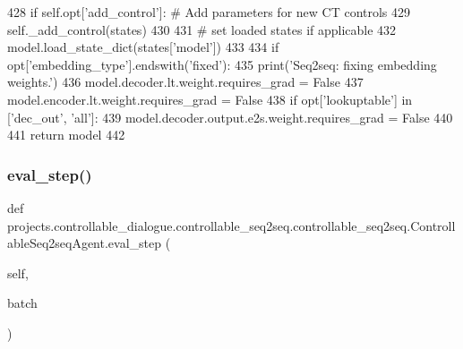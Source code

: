 \begin{DoxyCode}
428             \textcolor{keywordflow}{if} self.opt[\textcolor{stringliteral}{'add\_control'}]:  \textcolor{comment}{# Add parameters for new CT controls}
429                 self.\_add\_control(states)
430 
431             \textcolor{comment}{# set loaded states if applicable}
432             model.load\_state\_dict(states[\textcolor{stringliteral}{'model'}])
433 
434         \textcolor{keywordflow}{if} opt[\textcolor{stringliteral}{'embedding\_type'}].endswith(\textcolor{stringliteral}{'fixed'}):
435             print(\textcolor{stringliteral}{'Seq2seq: fixing embedding weights.'})
436             model.decoder.lt.weight.requires\_grad = \textcolor{keyword}{False}
437             model.encoder.lt.weight.requires\_grad = \textcolor{keyword}{False}
438             \textcolor{keywordflow}{if} opt[\textcolor{stringliteral}{'lookuptable'}] \textcolor{keywordflow}{in} [\textcolor{stringliteral}{'dec\_out'}, \textcolor{stringliteral}{'all'}]:
439                 model.decoder.output.e2s.weight.requires\_grad = \textcolor{keyword}{False}
440 
441         \textcolor{keywordflow}{return} model
442 
\end{DoxyCode}
\mbox{\label{classprojects_1_1controllable__dialogue_1_1controllable__seq2seq_1_1controllable__seq2seq_1_1ControllableSeq2seqAgent_a531943b5d1caee714bba77decbc93161}} 
\subsubsection{\texorpdfstring{eval\+\_\+step()}{eval\_step()}}
{\footnotesize\ttfamily def projects.\+controllable\+\_\+dialogue.\+controllable\+\_\+seq2seq.\+controllable\+\_\+seq2seq.\+Controllable\+Seq2seq\+Agent.\+eval\+\_\+step (\begin{DoxyParamCaption}\item[{}]{self,  }\item[{}]{batch }\end{DoxyParamCaption})}

